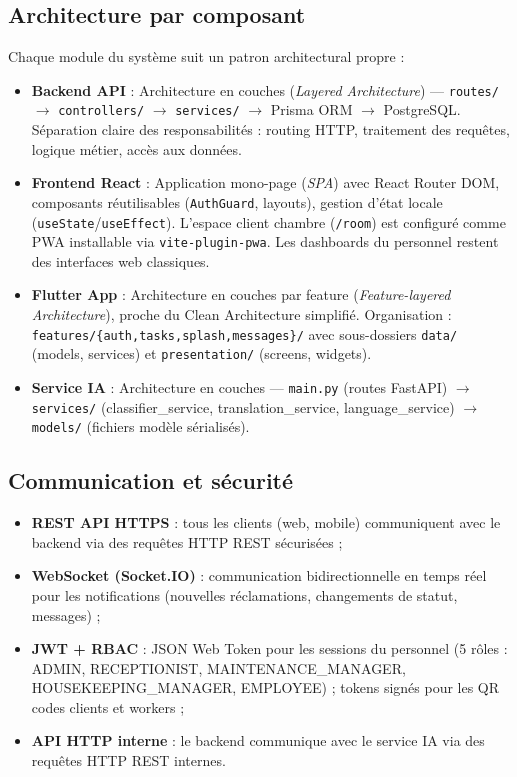 
\subsection{Architecture par composant}

Chaque module du système suit un patron architectural propre :

\begin{itemize}
  \item \textbf{Backend API} : Architecture en couches (\textit{Layered Architecture}) — \texttt{routes/} $\rightarrow$ \texttt{controllers/} $\rightarrow$ \texttt{services/} $\rightarrow$ Prisma ORM $\rightarrow$ PostgreSQL. Séparation claire des responsabilités : routing HTTP, traitement des requêtes, logique métier, accès aux données.

  \item \textbf{Frontend React} : Application mono-page (\textit{SPA}) avec React Router DOM, composants réutilisables (\texttt{AuthGuard}, layouts), gestion d'état locale (\texttt{useState}/\texttt{useEffect}). L'espace client chambre (\texttt{/room}) est configuré comme PWA installable via \texttt{vite-plugin-pwa}. Les dashboards du personnel restent des interfaces web classiques.

  \item \textbf{Flutter App} : Architecture en couches par feature (\textit{Feature-layered Architecture}), proche du Clean Architecture simplifié. Organisation : \texttt{features/\{auth,tasks,splash,messages\}/} avec sous-dossiers \texttt{data/} (models, services) et \texttt{presentation/} (screens, widgets).

  \item \textbf{Service IA} : Architecture en couches — \texttt{main.py} (routes FastAPI) $\rightarrow$ \texttt{services/} (classifier\_service, translation\_service, language\_service) $\rightarrow$ \texttt{models/} (fichiers modèle sérialisés).
\end{itemize}

\subsection{Communication et sécurité}

\begin{itemize}
  \item \textbf{REST API HTTPS} : tous les clients (web, mobile) communiquent avec le backend via des requêtes HTTP REST sécurisées ;
  \item \textbf{WebSocket (Socket.IO)} : communication bidirectionnelle en temps réel pour les notifications (nouvelles réclamations, changements de statut, messages) ;
  \item \textbf{JWT + RBAC} : JSON Web Token pour les sessions du personnel (5 rôles : ADMIN, RECEPTIONIST, MAINTENANCE\_MANAGER, HOUSEKEEPING\_MANAGER, EMPLOYEE) ; tokens signés pour les QR codes clients et workers ;
  \item \textbf{API HTTP interne} : le backend communique avec le service IA via des requêtes HTTP REST internes.
\end{itemize}


